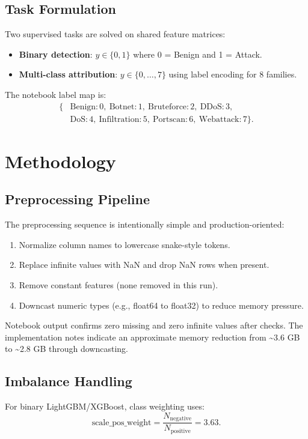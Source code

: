 \documentclass[10pt,journal]{IEEEtran}
\begin{document}
\subsection{Task Formulation}
Two supervised tasks are solved on shared feature matrices:
\begin{itemize}
\item \textbf{Binary detection}: $y \in \{0,1\}$ where 0 = Benign and 1 = Attack.
\item \textbf{Multi-class attribution}: $y \in \{0,\dots,7\}$ using label encoding for 8 families.
\end{itemize}

The notebook label map is:
\begin{equation*}
\begin{aligned}
\{&\text{Benign}:0,\ \text{Botnet}:1,\ \text{Bruteforce}:2,\ \text{DDoS}:3,\\
 &\text{DoS}:4,\ \text{Infiltration}:5,\ \text{Portscan}:6,\ \text{Webattack}:7\}.
\end{aligned}
\end{equation*}

\section{Methodology}
\subsection{Preprocessing Pipeline}
The preprocessing sequence is intentionally simple and production-oriented:
\begin{enumerate}
\item Normalize column names to lowercase snake-style tokens.
\item Replace infinite values with NaN and drop NaN rows when present.
\item Remove constant features (none removed in this run).
\item Downcast numeric types (e.g., float64 to float32) to reduce memory pressure.
\end{enumerate}

Notebook output confirms zero missing and zero infinite values after checks. The implementation notes indicate an approximate memory reduction from \textasciitilde3.6 GB to \textasciitilde2.8 GB through downcasting.

\subsection{Imbalance Handling}
For binary LightGBM/XGBoost, class weighting uses:
\begin{equation}
\text{scale\_pos\_weight} = \frac{N_{\text{negative}}}{N_{\text{positive}}} = 3.63.
\end{equation}
\end{document}
